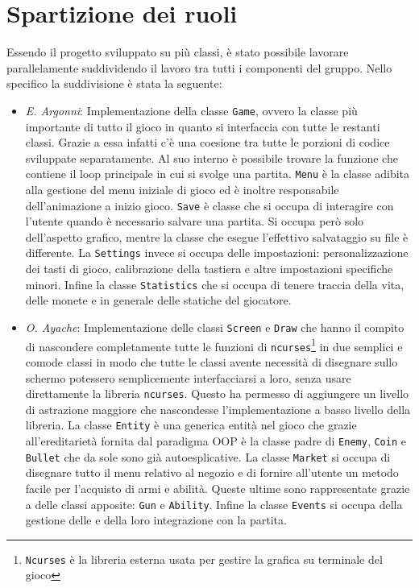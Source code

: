 \documentclass[a4paper]{article}
\begin{document}
\section{Spartizione dei ruoli}
Essendo il progetto sviluppato su più classi, è stato possibile lavorare 
parallelamente suddividendo il lavoro tra tutti i componenti del gruppo. Nello 
specifico la suddivisione è stata la seguente:
\begin{itemize}
  \item \emph{E. Argonni}: Implementazione della classe \texttt{Game}, ovvero la 
    classe più importante di tutto il gioco in quanto si interfaccia con tutte 
    le restanti classi. Grazie a essa infatti c'è una coesione tra tutte le 
    porzioni di codice sviluppate separatamente. Al suo interno è possibile 
    trovare la funzione che contiene il loop principale in cui si  svolge una 
    partita. \texttt{Menu} è la classe adibita alla gestione del menu iniziale 
    di gioco ed è inoltre responsabile dell'animazione a inizio gioco.
    \texttt{Save} è classe che si occupa di interagire con l'utente quando è 
    necessario salvare una partita. Si occupa però solo dell'aspetto grafico, 
    mentre la classe che esegue l'effettivo salvataggio su file è differente. 
    La \texttt{Settings} invece si occupa delle impostazioni: personalizzazione 
    dei tasti di gioco, calibrazione della tastiera e altre impostazioni 
    specifiche minori. Infine la classe \texttt{Statistics} che si occupa di 
    tenere traccia della vita, delle monete e in generale delle statiche del 
    giocatore.

  \item \emph{O. Ayache}: Implementazione delle classi \texttt{Screen} e 
    \texttt{Draw} che hanno il compito di nascondere completamente tutte le 
    funzioni di \texttt{ncurses}\footnote{\texttt{Ncurses} è la libreria esterna 
    usata per gestire la grafica su terminale del gioco} in due semplici e 
    comode classi in modo che tutte le classi avente necessità di disegnare 
    sullo schermo potessero semplicemente interfacciarsi a loro, senza usare 
    direttamente la libreria \texttt{ncurses}. Questo ha permesso di aggiungere 
    un livello di astrazione maggiore che nascondesse l'implementazione a basso 
    livello della libreria. La classe \texttt{Entity} è una generica entità nel
    gioco che grazie all'ereditarietà fornita dal paradigma OOP è la classe padre di
    \texttt{Enemy}, \texttt{Coin} e \texttt{Bullet} che da sole sono già 
    autoesplicative. La classe \texttt{Market} si occupa di disegnare tutto il 
    menu relativo al negozio e di fornire all'utente un metodo facile per 
    l'acquisto di armi e abilità. Queste ultime sono rappresentate grazie a
    delle classi apposite: \texttt{Gun} e \texttt{Ability}. Infine la classe 
    \texttt{Events} si occupa della gestione delle e della loro integrazione con
    la partita.


\end{itemize}
\end{document}
